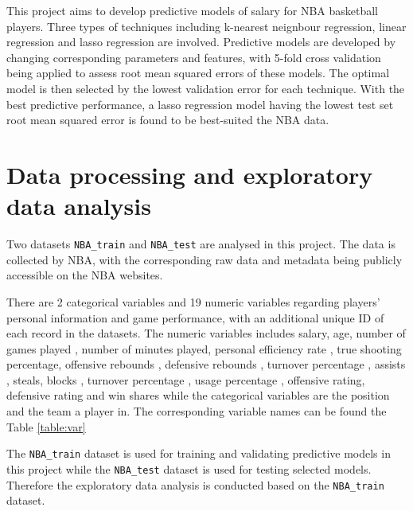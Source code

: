 \documentclass[letterpaper,12pt,twoside,]{pinp}
\begin{document}
This project aims to develop predictive models of salary for NBA
basketball players. Three types of techniques including k-nearest
neignbour regression, linear regression and lasso regression are
involved. Predictive models are developed by changing corresponding
parameters and features, with 5-fold cross validation being applied to
assess root mean squared errors of these models. The optimal model is
then selected by the lowest validation error for each technique. With
the best predictive performance, a lasso regression model having the
lowest test set root mean squared error is found to be best-suited the
NBA data.

\hypertarget{data-processing-and-exploratory-data-analysis}{%
\section{Data processing and exploratory data
analysis}\label{data-processing-and-exploratory-data-analysis}}

Two datasets \texttt{NBA\_train} and \texttt{NBA\_test} are analysed in
this project. The data is collected by NBA, with the corresponding raw
data and metadata being publicly accessible on the NBA websites.

There are 2 categorical variables and 19 numeric variables regarding
players' personal information and game performance, with an additional
unique ID of each record in the datasets. The numeric variables includes
salary, age, number of games played , number of minutes played, personal
efficiency rate , true shooting percentage, offensive rebounds ,
defensive rebounds , turnover percentage , assists , steals, blocks ,
turnover percentage , usage percentage , offensive rating, defensive
rating and win shares while the categorical variables are the position
and the team a player in. The corresponding variable names can be found
the Table \ref{table:var}

The \texttt{NBA\_train} dataset is used for training and validating
predictive models in this project while the \texttt{NBA\_test} dataset
is used for testing selected models. Therefore the exploratory data
analysis is conducted based on the \texttt{NBA\_train} dataset.
\end{document}
